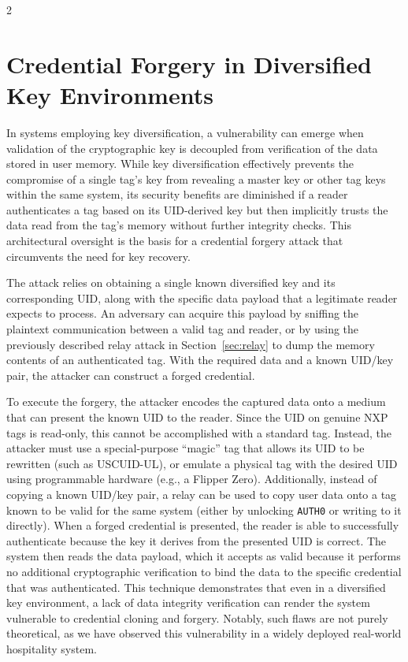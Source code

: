 \documentclass[10pt,letterpaper]{article}
\begin{document}
\begin{multicols}{2}
\section{Credential Forgery in Diversified Key Environments}
\label{sec:credforgery}
In systems employing key diversification, a vulnerability can emerge when validation of the cryptographic key is decoupled from verification of the data stored in user memory. While key diversification effectively prevents the compromise of a single tag's key from revealing a master key or other tag keys within the same system, its security benefits are diminished if a reader authenticates a tag based on its UID-derived key but then implicitly trusts the data read from the tag's memory without further integrity checks. This architectural oversight is the basis for a credential forgery attack that circumvents the need for key recovery.

The attack relies on obtaining a single known diversified key and its corresponding UID, along with the specific data payload that a legitimate reader expects to process. An adversary can acquire this payload by sniffing the plaintext communication between a valid tag and reader, or by using the previously described relay attack in Section~\ref{sec:relay} to dump the memory contents of an authenticated tag. With the required data and a known UID/key pair, the attacker can construct a forged credential.

To execute the forgery, the attacker encodes the captured data onto a medium that can present the known UID to the reader. Since the UID on genuine NXP tags is read-only, this cannot be accomplished with a standard tag. Instead, the attacker must use a special-purpose ``magic'' tag that allows its UID to be rewritten (such as USCUID-UL), or emulate a physical tag with the desired UID using programmable hardware (e.g., a Flipper Zero). Additionally, instead of copying a known UID/key pair, a relay can be used to copy user data onto a tag known to be valid for the same system (either by unlocking \texttt{AUTH0} or writing to it directly). When a forged credential is presented, the reader is able to successfully authenticate because the key it derives from the presented UID is correct. The system then reads the data payload, which it accepts as valid because it performs no additional cryptographic verification to bind the data to the specific credential that was authenticated. This technique demonstrates that even in a diversified key environment, a lack of data integrity verification can render the system vulnerable to credential cloning and forgery. Notably, such flaws are not purely theoretical, as we have observed this vulnerability in a widely deployed real-world hospitality system.


\end{multicols}
\end{document}
